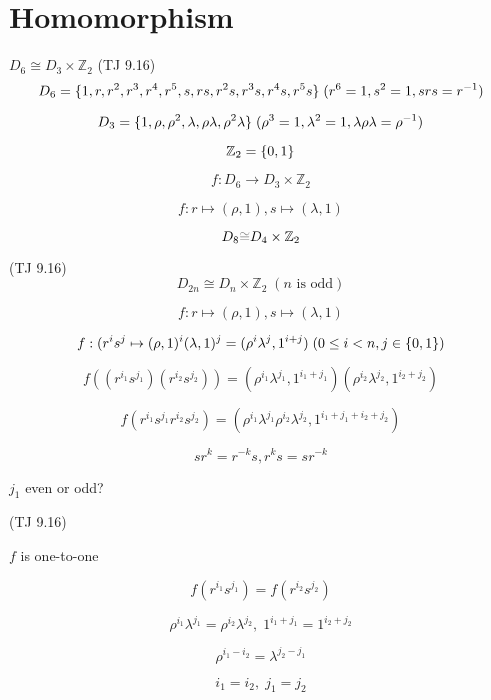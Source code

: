 \section{Homomorphism}

\begin{frame}{$D_6 \cong D_3 \times \mathbb{Z}_{2}$ (TJ 9.16)}
  \[
    D_6 = \{1, r, r^2, r^3, r^4, r^5, s, rs, r^{2}s, r^{3}s, r^{4}s, r^{5}s\}\; (r^6 = 1, s^2 = 1,
    srs = r^{-1})
  \]

  \[
    D_3 = \{1, \rho, \rho^2, \lambda, \rho\lambda, \rho^{2}\lambda\}\; (\rho^3 = 1, \lambda^2 = 1,
    \lambda\rho\lambda = \rho^{-1})
  \]

  \[
    \mathbb{Z}_{2} = \{0, 1\}
  \]

  \[
    f: D_6 \to D_3 \times \mathbb{Z}_{2}
  \]

  \[
    f: r \mapsto (\rho, 1), s \mapsto (\lambda, 1)
  \]

  \[
    D_8 \textcolor{gray}{\cong} D_4 \times \mathbb{Z}_{2}
  \]
\end{frame}
\begin{frame}{(TJ 9.16)}
  \[
    D_{2n} \cong D_{n} \times \mathbb{Z}_{2}\; (n \textrm{ is odd})
  \]

  \[
    f: r \mapsto (\rho, 1), s \mapsto (\lambda, 1)
  \]

  \[
    f: (r^{i}s^{j} \mapsto (\rho, 1)^{i} (\lambda, 1)^{j} = (\rho^{i}\lambda^{j}, 1^{i+j})\;
    (0 \le i < n, j \in \{0,1\})
  \]

  \[
    f((r^{i_1}s^{j_1})(r^{i_2}s^{j_2})) = (\rho^{i_1}\lambda^{j_1}, 1^{i_1 + j_1})
      (\rho^{i_2}\lambda^{j_2}, 1^{i_2 + j_2})
  \]

  \[
    f(r^{i_1}s^{j_1}r^{i_2}s^{j_2}) = (\rho^{i_1}\lambda^{j_1}\rho^{i_2}\lambda^{j_2}, 1^{i_1 + j_1
    + i_2 + j_2})
  \]

  \[
    sr^k = r^{-k}s, r^ks = sr^{-k}
  \]

  \centerline{$j_1$ even or odd?}
\end{frame}
\begin{frame}{(TJ 9.16)}
  \centerline{$f$ is one-to-one}

  \[
    f(r^{i_1}s^{j_1}) = f(r^{i_2}s^{j_2})
  \]

  \[
    \rho^{i_1}\lambda^{j_1} = \rho^{i_2}\lambda^{j_2},\; 1^{i_1 + j_1} = 1^{i_2 + j_2}
  \]

  \[
    \rho^{i_1 - i_2} = \lambda^{j_2 - j_1}
  \]

  \[
    i_1 = i_2,\; j_1 = j_2 
  \]
\end{frame}
